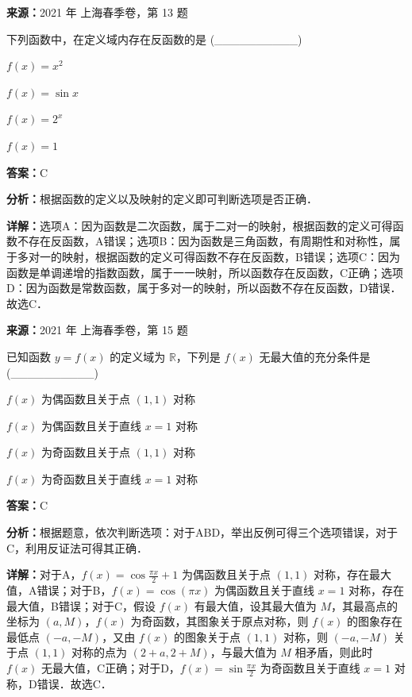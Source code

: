 \begin{question}[points=5]
\textbf{来源：}2021 年 上海春季卷，第 13 题\par
下列函数中，在定义域内存在反函数的是 (\_\_\_\_\_\_\_\_\_\_)
\begin{choices}
  \item $f(x)=x^2$
  \item $f(x)=\sin x$
  \item $f(x)=2^x$
  \item $f(x)=1$
\end{choices}
\begin{solution}
\textbf{答案：}C

\textbf{分析：}根据函数的定义以及映射的定义即可判断选项是否正确．

\textbf{详解：}选项A：因为函数是二次函数，属于二对一的映射，根据函数的定义可得函数不存在反函数，A错误；选项B：因为函数是三角函数，有周期性和对称性，属于多对一的映射，根据函数的定义可得函数不存在反函数，B错误；选项C：因为函数是单调递增的指数函数，属于一一映射，所以函数存在反函数，C正确；选项D：因为函数是常数函数，属于多对一的映射，所以函数不存在反函数，D错误．故选C．
\end{solution}
\end{question}

\begin{question}[points=5]
\textbf{来源：}2021 年 上海春季卷，第 15 题\par
已知函数 $y=f(x)$ 的定义域为 $\mathbb{R}$，下列是 $f(x)$ 无最大值的充分条件是 (\_\_\_\_\_\_\_\_\_\_)
\begin{choices}
  \item $f(x)$ 为偶函数且关于点 $(1,1)$ 对称
  \item $f(x)$ 为偶函数且关于直线 $x=1$ 对称
  \item $f(x)$ 为奇函数且关于点 $(1,1)$ 对称
  \item $f(x)$ 为奇函数且关于直线 $x=1$ 对称
\end{choices}
\begin{solution}
\textbf{答案：}C

\textbf{分析：}根据题意，依次判断选项：对于ABD，举出反例可得三个选项错误，对于C，利用反证法可得其正确．

\textbf{详解：}对于A，$f(x)=\cos\frac{\pi x}{2}+1$ 为偶函数且关于点 $(1,1)$ 对称，存在最大值，A错误；对于B，$f(x)=\cos(\pi x)$ 为偶函数且关于直线 $x=1$ 对称，存在最大值，B错误；对于C，假设 $f(x)$ 有最大值，设其最大值为 $M$，其最高点的坐标为 $(a,M)$，$f(x)$ 为奇函数，其图象关于原点对称，则 $f(x)$ 的图象存在最低点 $(-a,-M)$，又由 $f(x)$ 的图象关于点 $(1,1)$ 对称，则 $(-a,-M)$ 关于点 $(1,1)$ 对称的点为 $(2+a,2+M)$，与最大值为 $M$ 相矛盾，则此时 $f(x)$ 无最大值，C正确；对于D，$f(x)=\sin\frac{\pi x}{2}$ 为奇函数且关于直线 $x=1$ 对称，D错误．故选C．
\end{solution}
\end{question}

